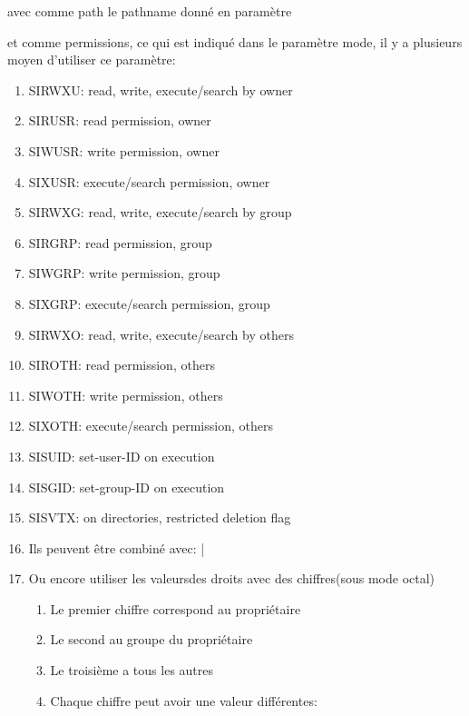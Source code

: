 \documentclass[a4paper]{article}
\begin{document}
\begin{description}
  \item avec comme path le pathname donné en paramètre
  \item et comme permissions, ce qui est indiqué dans le paramètre mode, il y a plusieurs moyen d'utiliser ce paramètre:
  \begin{enumerate}
    \item S\textunderscore{}IRWXU: read, write, execute/search by owner 
    \item S\textunderscore{}IRUSR: read permission, owner 
    \item S\textunderscore{}IWUSR: write permission, owner 
    \item S\textunderscore{}IXUSR: execute/search permission, owner 
    \item S\textunderscore{}IRWXG: read, write, execute/search by group 
    \item S\textunderscore{}IRGRP: read permission, group 
    \item S\textunderscore{}IWGRP: write permission, group 
    \item S\textunderscore{}IXGRP: execute/search permission, group 
    \item S\textunderscore{}IRWXO: read, write, execute/search by others 
    \item S\textunderscore{}IROTH: read permission, others 
    \item S\textunderscore{}IWOTH: write permission, others 
    \item S\textunderscore{}IXOTH: execute/search permission, others 
    \item S\textunderscore{}ISUID: set-user-ID on execution 
    \item S\textunderscore{}ISGID: set-group-ID on execution 
    \item S\textunderscore{}ISVTX: on directories, restricted deletion flag
    \item Ils peuvent être combiné avec: \guillemotleft{}|\guillemotright{}
    \item Ou encore utiliser les valeursdes droits avec des chiffres(sous mode octal)
    \begin{enumerate}
      \item Le premier chiffre correspond au propriétaire
      \item Le second au groupe du propriétaire
      \item Le troisième a tous les autres \newline
      \item Chaque chiffre peut avoir une valeur différentes:

\end{enumerate}
\end{enumerate}
\end{description}
\end{document}
